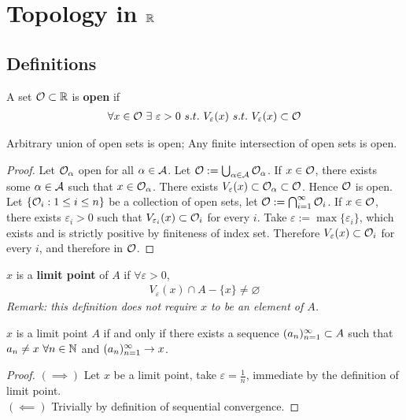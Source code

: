 \documentclass[11pt]{article}
\begin{document}
	\section{Topology in $\mathbb{R}$}
	\subsection{Definitions}
	\begin{definition}
		A set $\mathcal{{O}} \subset \mathbb{R}$ is \textbf{open} if
		\begin{align}
			\forall x \in \mc{O}\ \exists\ \varepsilon > 0\ s.t.\ V_\varepsilon(x)\ s.t.\ V_\varepsilon(x) \subset \mc{O}
		\end{align}
	\end{definition}
	
	\begin{theorem}
		Arbitrary union of open sets is open; Any finite intersection of open sets is open.
	\end{theorem}
	
	\begin{proof}
		Let $\mathcal{{O}}_\alpha$ open for all $\alpha \in \mathcal{{A}}$. Let $\mathcal{{O}} := \bigcup_{\alpha \in \mathcal{{A}}} \mathcal{{O}}_\alpha$. If $x \in \mathcal{{O}}$, there exists some $\alpha \in \mathcal{{A}}$ such that $x \in \mathcal{{O}}_\alpha$. There exists $V_\varepsilon(x) \subset \mathcal{{O}}_{\alpha} \subset \mathcal{{O}}$. Hence $\mathcal{{O}}$ is open.
		\\
		Let $\{\mathcal{{O}}_i: 1 \leq i \leq n\}$ be a collection of open sets, let $\mathcal{{O}} := \bigcap_{i=1}^\infty \mathcal{{O}}_i$. If $x \in \mathcal{{O}}$, there exists $\varepsilon_i > 0$ such that $V_{\varepsilon_i}(x) \subset \mathcal{{O}}_i$ for every $i$. Take $\varepsilon := \max\{\varepsilon_i\}$, which exists and is strictly positive by finiteness of index set. Therefore $V_\varepsilon(x) \subset \mathcal{{O}}_i$ for every $i$, and therefore in $\mathcal{{O}}$.
	\end{proof}
	
	\begin{definition}
		$x$ is a \textbf{limit point} of $A$ if $\forall \varepsilon > 0$,
		\begin{align}
			V_\varepsilon(x) \cap A - \{x\} \neq \varnothing
		\end{align}
		\emph{Remark: this definition does not require $x$ to be an element of $A$.}
	\end{definition}
	
	\begin{theorem}
		$x$ is a limit point $A$ if and only if there exists a sequence $({a}_{n})_{{n}=1}^\infty \subset A$ such that \ul{$a_n \neq x\ \forall n \in \mathbb{N}$} and $({a}_{n})_{{n}=1}^\infty \to x$.
	\end{theorem}
	\begin{proof}
		$(\implies)$ Let $x$ be a limit point, take $\varepsilon = \frac{1}{n}$, immediate by the definition of limit point. \\
		$(\impliedby)$ Trivially by definition of sequential convergence.
	\end{proof}
	
\end{document}
